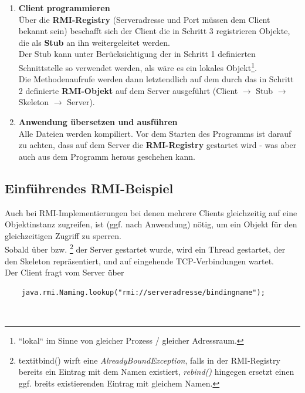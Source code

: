 \begin{enumerate}
    \item \textbf{Client programmieren}\\
    \noindent
    Über die \textbf{RMI-Registry} (Serveradresse und Port müssen dem Client bekannt sein) beschafft sich der Client die in Schritt 3 registrieren Objekte, die als \textbf{Stub} an ihn weitergeleitet werden.\\
    \noindent
    Der Stub kann unter Berücksichtigung der in Schritt 1 definierten Schnittstelle so verwendet werden, als wäre es ein lokales Objekt\footnote{
    ``lokal`` im Sinne von gleicher Prozess / gleicher Adressraum.
    }.\\
    \noindent
    Die Methodenaufrufe werden dann letztendlich auf dem durch das in Schritt 2 definierte \textbf{RMI-Objekt} auf dem Server ausgeführt (Client $\rightarrow$ Stub $\rightarrow$ Skeleton $\rightarrow$ Server).

    \item \textbf{Anwendung übersetzen und ausführen}\\
    \noindent
    Alle Dateien werden kompiliert.
    Vor dem Starten des Programms ist darauf zu achten, dass auf dem Server die \textbf{RMI-Registry} gestartet wird - was aber auch aus dem Programm heraus geschehen kann.
\end{enumerate}

\subsection{Einführendes RMI-Beispiel}\label{sec:rmiintro}

Auch bei RMI-Implementierungen bei denen mehrere Clients gleichzeitig auf eine Objektinstanz zugreifen, ist (ggf. nach Anwendung)  nötig, um ein Objekt für den gleichzeitigen Zugriff zu sperren.\\

\noindent
Sobald über  bzw. \footnote{
textit{bind()} wirft eine \textit{AlreadyBoundException}, falls in der RMI-Registry bereits ein Eintrag mit dem Namen existiert, \textit{rebind()} hingegen ersetzt einen ggf. breits existierenden Eintrag mit gleichem Namen.
} der Server gestartet wurde, wird ein Thread gestartet, der den Skeleton repräsentiert, und auf eingehende TCP-Verbindungen wartet.\\

\noindent
Der Client fragt vom Server über

\begin{verbatim}
    java.rmi.Naming.lookup("rmi://serveradresse/bindingname");
\end{verbatim}\\

